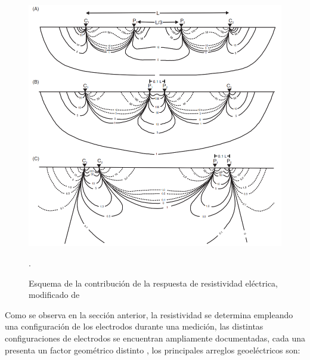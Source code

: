 					\begin{figure}[h!]
						\centering
						\includegraphics[width=12cm]{Imagenes/5}
						\caption[Esquema de la contribución de la respuesta eléctrica]{Esquema de la contribución de la respuesta de resistividad eléctrica, modificado de \citet{reynolds2011}}.
						\label{fig:Contri}
					\end{figure}				
				
				Como se observa en la sección anterior, la resistividad se determina empleando una configuración de los electrodos durante una medición, las distintas configuraciones de electrodos se encuentran ampliamente documentadas, cada una presenta un factor geométrico distinto \citep{igboama2023, lowrie2020}, los principales arreglos geoeléctricos son:
				
